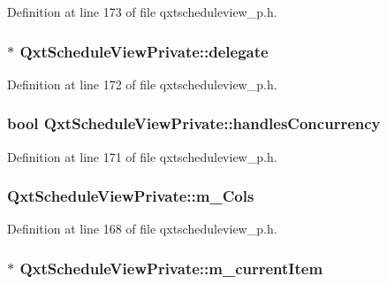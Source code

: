 Definition at line 173 of file qxtscheduleview\-\_\-p.\-h.

\hypertarget{class_qxt_schedule_view_private_a98dc6cc67d2e8558e87b1b8048cb006e}{
\subsubsection[{delegate}]{$\ast$ Qxt\-Schedule\-View\-Private\-::delegate}}\label{class_qxt_schedule_view_private_a98dc6cc67d2e8558e87b1b8048cb006e}


Definition at line 172 of file qxtscheduleview\-\_\-p.\-h.

\hypertarget{class_qxt_schedule_view_private_ab8ffcb1e26c62bd1a090ce13f4438735}{
\subsubsection[{handles\-Concurrency}]{\setlength{\rightskip}{0pt plus 5cm}bool Qxt\-Schedule\-View\-Private\-::handles\-Concurrency}}\label{class_qxt_schedule_view_private_ab8ffcb1e26c62bd1a090ce13f4438735}


Definition at line 171 of file qxtscheduleview\-\_\-p.\-h.

\hypertarget{class_qxt_schedule_view_private_abdc6a83bd72e6fe6bed43c56c4affe88}{
\subsubsection[{m\-\_\-\-Cols}]{ Qxt\-Schedule\-View\-Private\-::m\-\_\-\-Cols}}\label{class_qxt_schedule_view_private_abdc6a83bd72e6fe6bed43c56c4affe88}


Definition at line 168 of file qxtscheduleview\-\_\-p.\-h.

\hypertarget{class_qxt_schedule_view_private_adbd3d0ac27543a57b9f8690fab96ac6f}{
\subsubsection[{m\-\_\-current\-Item}]{$\ast$ Qxt\-Schedule\-View\-Private\-::m\-\_\-current\-Item}}\label{class_qxt_schedule_view_private_adbd3d0ac27543a57b9f8690fab96ac6f}


